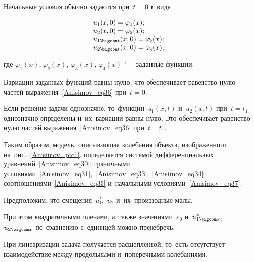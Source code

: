 Начальные условия обычно задаются при~$t=0$ в~виде

\begin{equation}\label{Anisimov_eq37}

\begin{array}{ll}

 u_1(x, 0)=\varphi_1(x);\\

  u_2(x, 0)=\varphi_2(x);\\

 u_{1 \bigcom t}(x, 0)=\varphi_3(x); \\  u_{2 \bigcom t}(x, 0)=\varphi_4(x),

\end{array}

\end{equation}

где $\varphi_1(x)$, $\varphi_2(x)$, $\varphi_3(x)$, $\varphi_4(x)$ "--- заданные функции. 

Вариации заданных функций равны нулю, что обеспечивает равенство нулю частей выражения~\eqref{Anisimov_eq36} при~$t=0$.



Если решение задачи однозначно, то~функции~$u_1( x,  t )$ и~$u_2( x,  t )$ при~\mbox{$t=t_1$} однозначно определены и~их~вариации равны нулю. Это обеспечивает равенство нулю частей выражения~\eqref{Anisimov_eq36} при~$t=t_1$.



Таким образом, модель, описывающая колебания объекта, изображенного на~рис.~\ref{Anisimov_pic1}, определяется  системой дифференциальных уравнений~\eqref{Anisimov_eq30}; граничными условиями~\eqref{Anisimov_eq31},~\eqref{Anisimov_eq33},~\eqref{Anisimov_eq34}; соотношениями~\eqref{Anisimov_eq35} и~начальными условиями~\eqref{Anisimov_eq37}.



\smallskip



 Предположим, что смещения~$u_1^{*}$,~$u_2$ и~их~производные малы. 

При этом квадратичными членами, а~также значениями~$\varepsilon_0$ и~$u_{1 \bigcom x}^{*}$,~$u_{2 \bigcom x}$ по~сравнению с~единицей можно пренебречь. 

При линеаризации задача получается расщеплённой, то~есть отсутствует взаимодействие между продольными и~поперечными колебаниями.



\smallskip



